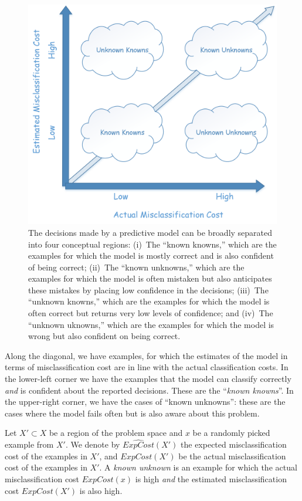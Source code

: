 \begin{figure}[t]
\centering
\includegraphics[width=0.5\columnwidth]{plots/Quadrant.png}
\caption{The decisions made by a predictive model can be broadly separated into four conceptual regions: (i)~The ``known knowns,'' which are the examples for which the model is mostly correct and is also confident of being correct; (ii)~The ``known unknowns,'' which are the examples for which the model is often mistaken but also anticipates these mistakes by placing low confidence in the decisions; (iii)~The ``unknown knowns,'' which are the examples for which the model is often correct but returns very low levels of confidence; and (iv)~The ``unknown uknowns,'' which are the examples for which the model is wrong but also confident on being correct.}
\label{fig:quadrant}
\end{figure}

Along the diagonal, we have examples, for which the estimates of the model in terms of misclassification cost are in line with the actual classification costs. In the lower-left corner we have the examples that the model can classify correctly \emph{and} is confident about the reported decisions. These are the ``\emph{known knowns}''. In the upper-right corner, we have the cases of ``known unknowns'': these are the cases where the model fails often but is also aware about this problem.

\begin{definition}
\label{def:ku}
Let $X' \subset X$ be a region of the problem space and $x$ be a randomly picked example from $X'$. 
We denote by $\widehat{\mathit{ExpCost}}(X')$ the expected misclassification cost of the examples in $X'$, and $\mathit{ExpCost}(X')$ be the actual misclassification cost of the examples in $X'$. A \emph{known unknown} is an example for which the actual misclassification cost $\mathit{ExpCost}(x)$ is high \emph{and} the estimated misclassification cost $\mathit{ExpCost}(X')$ is also high.
\end{definition}

